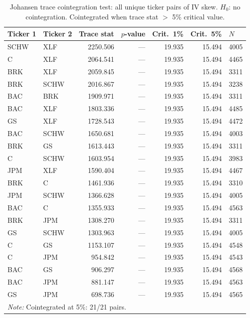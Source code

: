 \documentclass[12pt, a4paper]{article}
\begin{document}
\begin{table}[h]
\centering
\small
\caption{Johansen trace cointegration test: all unique ticker pairs of IV skew. $H_0$: no cointegration. Cointegrated when trace stat $>$ 5\% critical value.}
\label{tab:coint_pairs_johansen}
\begin{tabular}{llrrrrl}
\toprule
Ticker 1 & Ticker 2 & Trace stat & $p$-value & Crit.\ 1\% & Crit.\ 5\% & $N$ \\
\midrule
SCHW & XLF & 2250.506 & --- & 19.935 & 15.494 & 4005 \\
C & XLF & 2064.541 & --- & 19.935 & 15.494 & 4465 \\
BRK & XLF & 2059.845 & --- & 19.935 & 15.494 & 3311 \\
BRK & SCHW & 2016.867 & --- & 19.935 & 15.494 & 3238 \\
BAC & BRK & 1909.971 & --- & 19.935 & 15.494 & 3311 \\
BAC & XLF & 1803.336 & --- & 19.935 & 15.494 & 4485 \\
GS & XLF & 1728.543 & --- & 19.935 & 15.494 & 4472 \\
BAC & SCHW & 1650.681 & --- & 19.935 & 15.494 & 4003 \\
BRK & GS & 1613.443 & --- & 19.935 & 15.494 & 3311 \\
C & SCHW & 1603.954 & --- & 19.935 & 15.494 & 3983 \\
JPM & XLF & 1590.404 & --- & 19.935 & 15.494 & 4467 \\
BRK & C & 1461.936 & --- & 19.935 & 15.494 & 3310 \\
JPM & SCHW & 1366.628 & --- & 19.935 & 15.494 & 4005 \\
BAC & C & 1355.933 & --- & 19.935 & 15.494 & 4563 \\
BRK & JPM & 1308.270 & --- & 19.935 & 15.494 & 3311 \\
GS & SCHW & 1303.963 & --- & 19.935 & 15.494 & 4005 \\
C & GS & 1153.107 & --- & 19.935 & 15.494 & 4548 \\
C & JPM & 954.842 & --- & 19.935 & 15.494 & 4543 \\
BAC & GS & 906.297 & --- & 19.935 & 15.494 & 4568 \\
BAC & JPM & 881.147 & --- & 19.935 & 15.494 & 4563 \\
GS & JPM & 698.736 & --- & 19.935 & 15.494 & 4565 \\
\bottomrule
\multicolumn{7}{l}{\textit{Note: } Cointegrated at 5\%: 21/21 pairs.} \\
\end{tabular}
\end{table}
\end{document}
